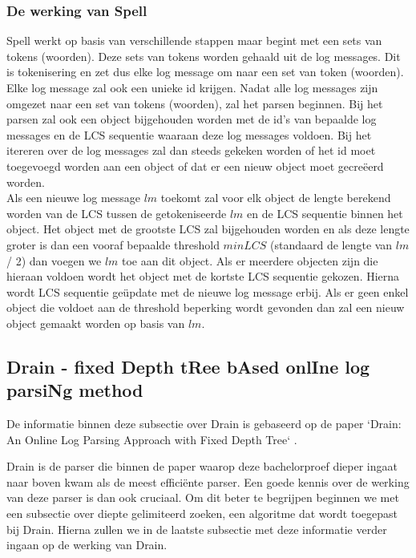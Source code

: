 \subsubsection{De werking van Spell}
Spell werkt op basis van verschillende stappen maar begint met een sets van tokens (woorden). Deze sets van tokens worden gehaald uit de log messages. Dit is tokenisering en zet dus elke log message om naar een set van token (woorden). Elke log message zal ook een unieke id krijgen. Nadat alle log messages zijn omgezet naar een set van tokens (woorden), zal het parsen beginnen. Bij het parsen zal ook een object bijgehouden worden met de id's van bepaalde log messages en de LCS sequentie waaraan deze log messages voldoen. Bij het itereren over de log messages zal dan steeds gekeken worden of het id moet toegevoegd worden aan een object of dat er een nieuw object moet gecreëerd worden.\\

Als een nieuwe log message $lm$ toekomt zal voor elk object de lengte berekend worden van de LCS tussen de getokeniseerde $lm$ en de LCS sequentie binnen het object. Het object met de grootste LCS zal bijgehouden worden en als deze lengte groter is dan een vooraf bepaalde threshold $minLCS$ (standaard de lengte van $lm$ / 2) dan voegen we $lm$ toe aan dit object. Als er meerdere objecten zijn die hieraan voldoen wordt het object met de kortste LCS sequentie gekozen. Hierna wordt LCS sequentie geüpdate met de nieuwe log message erbij. Als er geen enkel object die voldoet aan de threshold beperking wordt gevonden dan zal een nieuw object gemaakt worden op basis van $lm$.

\subsection{Drain - fixed Depth tRee bAsed onlIne log parsiNg method}
De informatie binnen deze subsectie over Drain is gebaseerd op de paper `Drain: An Online Log Parsing Approach with Fixed Depth Tree` \autocite{he2017drain}.

Drain is de parser die binnen de paper waarop deze bachelorproef dieper ingaat \autocite{TBA2019} naar boven kwam als de meest efficiënte parser. Een goede kennis over de werking van deze parser is dan ook cruciaal. Om dit beter te begrijpen beginnen we met een subsectie over diepte gelimiteerd zoeken, een algoritme dat wordt toegepast bij Drain. Hierna zullen we in de laatste subsectie met deze informatie verder ingaan op de werking van Drain.

